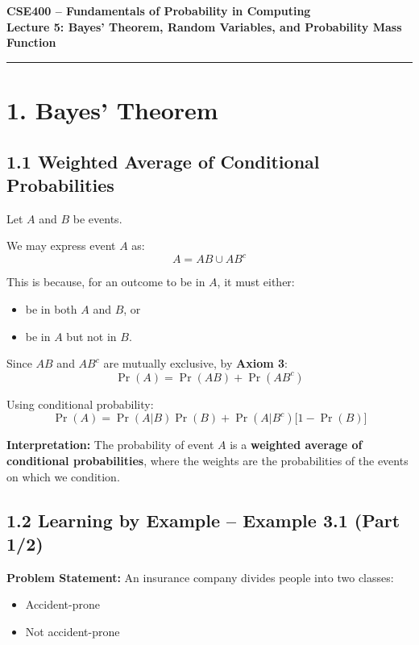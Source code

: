 \documentclass[12pt]{article}
\begin{document}
\begin{center}
\Large \textbf{CSE400 – Fundamentals of Probability in Computing} \\
\vspace{0.2cm}
\large \textbf{Lecture 5: Bayes’ Theorem, Random Variables, and Probability Mass Function}
\end{center}

\hrule
\vspace{0.5cm}

\section*{1. Bayes’ Theorem}

\subsection*{1.1 Weighted Average of Conditional Probabilities}

Let $A$ and $B$ be events.

We may express event $A$ as:
\[
A = AB \cup AB^c
\]

This is because, for an outcome to be in $A$, it must either:
\begin{itemize}
    \item be in both $A$ and $B$, or
    \item be in $A$ but not in $B$.
\end{itemize}

Since $AB$ and $AB^c$ are mutually exclusive, by \textbf{Axiom 3}:
\[
\Pr(A) = \Pr(AB) + \Pr(AB^c)
\]

Using conditional probability:
\[
\Pr(A) = \Pr(A|B)\Pr(B) + \Pr(A|B^c)\bigl[1 - \Pr(B)\bigr]
\]

\textbf{Interpretation:}  
The probability of event $A$ is a \textbf{weighted average of conditional probabilities}, where the weights are the probabilities of the events on which we condition.

\subsection*{1.2 Learning by Example – Example 3.1 (Part 1/2)}

\textbf{Problem Statement:}  
An insurance company divides people into two classes:
\begin{itemize}
    \item Accident-prone
    \item Not accident-prone
\end{itemize}
\end{document}
